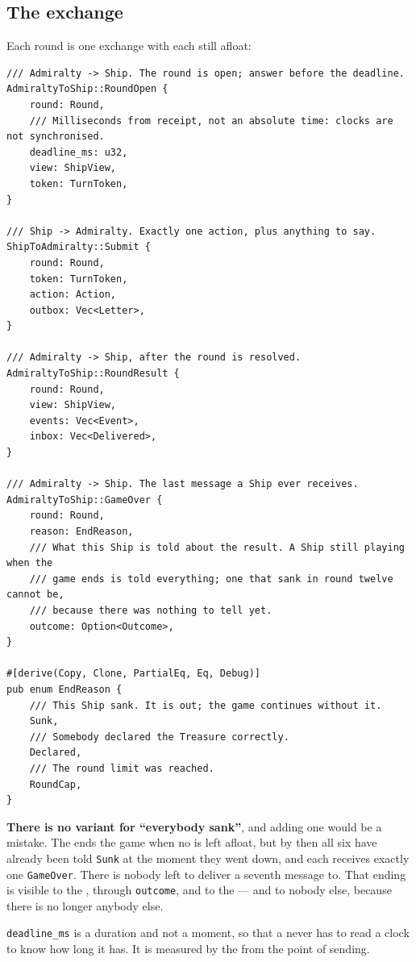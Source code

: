 \documentclass{article}
\begin{document}
\subsection{The exchange}

Each round is one exchange with each \ship{} still afloat:

\begin{lstlisting}
/// Admiralty -> Ship. The round is open; answer before the deadline.
AdmiraltyToShip::RoundOpen {
    round: Round,
    /// Milliseconds from receipt, not an absolute time: clocks are not synchronised.
    deadline_ms: u32,
    view: ShipView,
    token: TurnToken,
}

/// Ship -> Admiralty. Exactly one action, plus anything to say.
ShipToAdmiralty::Submit {
    round: Round,
    token: TurnToken,
    action: Action,
    outbox: Vec<Letter>,
}

/// Admiralty -> Ship, after the round is resolved.
AdmiraltyToShip::RoundResult {
    round: Round,
    view: ShipView,
    events: Vec<Event>,
    inbox: Vec<Delivered>,
}

/// Admiralty -> Ship. The last message a Ship ever receives.
AdmiraltyToShip::GameOver {
    round: Round,
    reason: EndReason,
    /// What this Ship is told about the result. A Ship still playing when the
    /// game ends is told everything; one that sank in round twelve cannot be,
    /// because there was nothing to tell yet.
    outcome: Option<Outcome>,
}

#[derive(Copy, Clone, PartialEq, Eq, Debug)]
pub enum EndReason {
    /// This Ship sank. It is out; the game continues without it.
    Sunk,
    /// Somebody declared the Treasure correctly.
    Declared,
    /// The round limit was reached.
    RoundCap,
}
\end{lstlisting}

\textbf{There is no variant for ``everybody sank''}, and adding one would be a mistake. The \MD{}
ends the game when no \ship{} is left afloat, but by then all six have already been told
\texttt{Sunk} at the moment they went down, and each receives exactly one \texttt{GameOver}. There
is nobody left to deliver a seventh message to. That ending is visible to the \chart{}, through
\texttt{outcome}, and to the \cartographer{} --- and to nobody else, because there is no longer
anybody else.

\texttt{deadline\_ms} is a duration and not a moment, so that a \ship{} never has to read a clock
to know how long it has. It is measured by the \admiralty{} from the point of sending.
\end{document}
